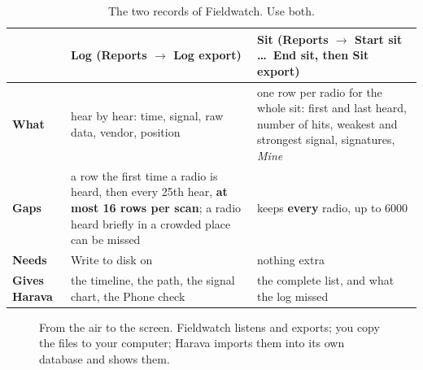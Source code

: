\documentclass[10pt,a4paper]{article}
\newcommand{\ui}[1]{\textsf{\small #1}}            %
\begin{document}
\begin{table}[H]\small\centering
\begin{tabularx}{\textwidth}{>{\bfseries}p{2.1cm}XX}
\toprule
 & \textbf{Log} (Reports $\rightarrow$ Log export) & \textbf{Sit} (Reports $\rightarrow$ Start sit \dots\ End sit, then Sit export)\\
\midrule
What & hear by hear: time, signal, raw data, vendor, position & one row per radio for the whole sit: first and last heard, number of hits, weakest and strongest signal, signatures, \emph{Mine}\\
Gaps & a row the first time a radio is heard, then every 25th hear, \textbf{at most 16 rows per scan}; a radio heard briefly in a crowded place can be missed & keeps \textbf{every} radio, up to 6000\\
Needs & \ui{Write to disk} on & nothing extra\\
Gives Harava & the timeline, the path, the signal chart, the Phone check & the complete list, and what the log missed\\
\bottomrule
\end{tabularx}
\caption{The two records of Fieldwatch. Use both.}
\end{table}

\begin{figure}[H]\centering
{}
\caption{From the air to the screen. Fieldwatch listens and exports; you copy the files to your computer; Harava imports them into its own database and shows them.}
\end{figure}
\end{document}
